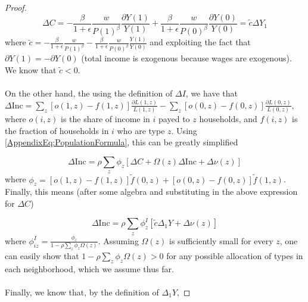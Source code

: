 \documentclass[12pt]{article}
\begin{document}
\begin{enumerate}
\begin{proof}
		 \begin{equation*}
		 	\Delta C = -\frac{\beta}{1 + \epsilon}\frac{w}{P(1)^{\beta}}\frac{\partial Y(1)}{Y(1)} + \frac{\beta}{1 + \epsilon}\frac{w}{P(0)^{\beta}}\frac{\partial Y(0)}{Y(0)} = \tilde{c}\Delta Y_{1}
		 \end{equation*}
		 where $\tilde{c} = -\frac{\beta}{1 + \epsilon}\frac{w}{P(1)^{\beta}} - \frac{\beta}{1 + \epsilon}\frac{w}{P(0)^{\beta}}\frac{Y(1)}{Y(0)}$ and exploiting the fact that $\partial Y(1) = -\partial Y(0)$ (total income is exogenous because wages are exogenous). We know that $\tilde{c} < 0$. 
		
		\paragraph*{}
		 On the other hand, the using the definition of $\Delta I$, we have that  $\Delta \text{Inc} = \sum_{z}[o(1, z) - f(1, z)]\frac{\partial L(1, z)}{L(1, z)} - \sum_{z}[o(0, z) - f(0, z)]\frac{\partial L(0, z)}{L(0, z)}$, where $o(i, z)$ is the share of income in $i$ payed to $z$ households, and $f(i, z)$ is the fraction of households in $i$ who are type $z$. Using \eqref{AppendixEq:PopulationFormula}, this can be greatly simplified
		
		 \begin{equation*}
		 	\Delta \text{Inc} = \rho \sum_{z}\phi_{z}[\Delta C + \Omega(z) \Delta \text{Inc} + \Delta \nu(z)]
		 \end{equation*}
		 where $\phi_{z} = [o(1,z) - f(1, z)]\tilde{f}(0, z) + [o(0,z) - f(0, z)]\tilde{f}(1, z)$. Finally, this means (after some algebra and substituting in the above expression for $\Delta C$)
		 
		 \begin{equation}\label{AppendixEq:IncomeEquilibrium}
		 	\Delta \text{Inc} = \rho \sum_{z}\phi^{I}_{z}[\tilde{c} \Delta_{1} Y + \Delta \nu(z)]
		 \end{equation}
		 where $\phi^{I}_{iz} = \frac{\phi_{z}}{1 - \rho\sum_{z}\phi_{z}\Omega(z)}$. Assuming $\Omega(z)$ is sufficiently small for every $z$, one can easily show that $1 - \rho\sum_{z}\phi_{z}\Omega(z) > 0$ for any possible allocation of types in each neighborhood, which we assume thus far. 
		 
		 \paragraph*{}
		 Finally,  we know that, by the definition of $\Delta_{1}Y$, 
		 

\end{proof}
\end{enumerate}
\end{document}
